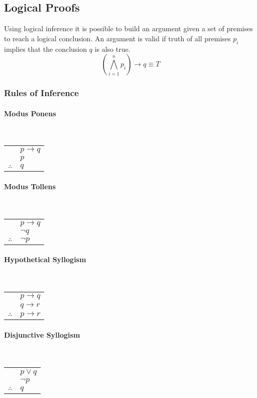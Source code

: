 \documentclass[a4paper, 10pt]{article}
\begin{document}
\newpage
\subsection{Logical Proofs}
Using logical inference it is possible to build an argument given a set of premises to reach a logical conclusion. An argument is valid if truth of all premises \(p_i\) implies that the conclusion \(q\) is also true.
\[\left(\bigwedge_{i=1}^n p_i\right)\rightarrow q \equiv T\]

\subsubsection{Rules of Inference}
\begin{multicols}{3}
\paragraph{Modus Ponens}\mbox{}\\
\begin{tabular}{c@{\,}l@{}}
                & \(p\rightarrow q\) \\
                & \(p\) \\\cline{2-2}
\(\therefore\)  & \(q\)
\end{tabular}

\paragraph{Modus Tollens}\mbox{}\\
\begin{tabular}{c@{\,}l@{}}
                & \(p\rightarrow q\) \\
                & \(\neg q\) \\\cline{2-2}
\(\therefore\)  & \(\neg p\)
\end{tabular}

\paragraph{Hypothetical Syllogism}\mbox{}\\
\begin{tabular}{c@{\,}l@{}}
                & \(p\rightarrow q\) \\
                & \(q\rightarrow r\) \\\cline{2-2}
\(\therefore\)  & \(p\rightarrow r\)
\end{tabular}

\paragraph{Disjunctive Syllogism}\mbox{}\\
\begin{tabular}{c@{\,}l@{}}
                & \(p\lor q\) \\
                & \(\neg p\) \\\cline{2-2}
\(\therefore\)  & \(q\)
\end{tabular}


\end{multicols}
\end{document}
